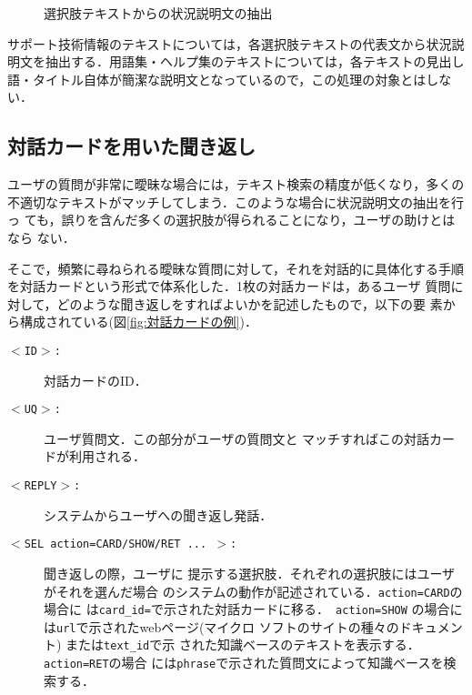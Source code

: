 \begin{figure}
 \begin{center}
  \caption{選択肢テキストからの状況説明文の抽出} 
  \label{fig:選択肢テキストからの状況説明文の抽出}
 \end{center}
\end{figure}

サポート技術情報のテキストについては，各選択肢テキストの代表文から状況説
明文を抽出する．用語集・ヘルプ集のテキストについては，各テキストの見出し
語・タイトル自体が簡潔な説明文となっているので，この処理の対象とはしない．



\subsection{対話カードを用いた聞き返し} \label{subsec:対話カードを用いた聞き返し}





ユーザの質問が非常に曖昧な場合には，テキスト検索の精度が低くなり，多くの
不適切なテキストがマッチしてしまう．このような場合に状況説明文の抽出を行っ
ても，誤りを含んだ多くの選択肢が得られることになり，ユーザの助けとはなら
ない．

そこで，頻繁に尋ねられる曖昧な質問に対して，それを対話的に具体化する手順
を対話カードという形式で体系化した．1枚の対話カードは，あるユーザ
質問に対して，どのような聞き返しをすればよいかを記述したもので，以下の要
素から構成されている(図\ref{fig:対話カードの例})．

\begin{description}
 \item[\tt $<$ID$>$:] 対話カードのID．
 \item[\tt $<$UQ$>$:] ユーザ質問文．この部分がユーザの質問文と
       マッチすればこの対話カードが利用される．
 \item[\tt $<$REPLY$>$:] システムからユーザへの聞き返し発話．
 \item[\tt $<$SEL action=CARD/SHOW/RET ... $>$:] 聞き返しの際，ユーザに
	    提示する選択肢．それぞれの選択肢にはユーザがそれを選んだ場合
	    のシステムの動作が記述されている．{\tt action=CARD}の場合に
	    は{\tt card\_id=}で示された対話カードに移る．{\tt
	    action=SHOW} の場合には{\tt url}で示されたwebページ(マイクロ
	    ソフトのサイトの種々のドキュメント) または{\tt text\_id}で示
	    された知識ベースのテキストを表示する．{\tt action=RET}の場合
	    には{\tt phrase}で示された質問文によって知識ベースを検索する．
\end{description}


